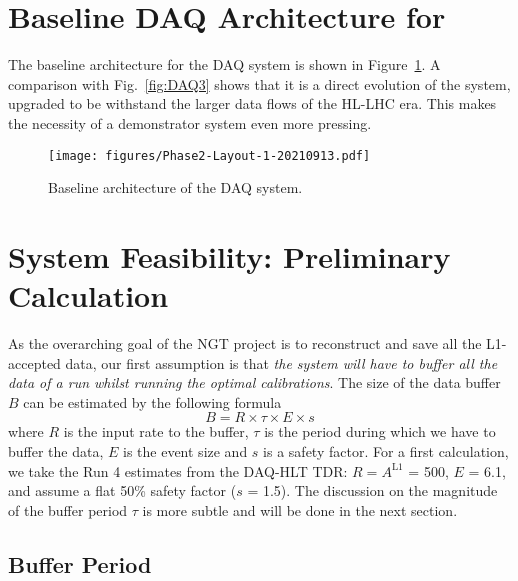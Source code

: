 
\section{Baseline DAQ Architecture for \Phasetwo}

The baseline architecture for  the \Phasetwo DAQ system is shown in Figure~\ref{fig:DAQP2}.
A comparison with Fig.~\ref{fig:DAQ3} shows that it is a direct evolution of the \Runtwo system,
upgraded to be withstand the larger data flows of the HL-LHC era.
This makes the necessity of a demonstrator system even more pressing.

\begin{figure}[htbp]
   \centering
	\texttt{[image: figures/Phase2-Layout-1-20210913.pdf]}
  \caption{Baseline architecture of the \Phasetwo DAQ system.}
   \label{fig:DAQP2}
\end{figure}


\section{System Feasibility: Preliminary Calculation}

As the overarching goal of the NGT project is to reconstruct and save all the L1-accepted data, 
our first assumption is that 
\emph{the system will have to buffer all the data of a run whilst running the optimal calibrations}.
The size of the data buffer $B$ can be estimated by the following formula
\begin{equation}
B = R \times \tau \times E \times s
\label{eq:buffersize}
\end{equation}
where $R$ is the input rate to the buffer,
$\tau$ is the period during which we have to buffer the data,
$E$ is the event size and
$s$ is a safety factor.
For a first calculation, we take the Run 4 estimates from the DAQ-HLT TDR:
$R = A^\text{L1}$ = 500\kHz, $E$ = 6.1\MB,
and assume a flat 50\% safety factor ($s$ = 1.5).
The discussion on the magnitude of the buffer period $\tau$ is more subtle and will be done in the next section.

\subsection{Buffer Period}

